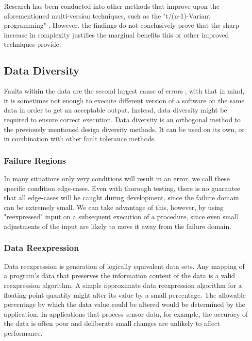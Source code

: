 \documentclass[12pt, letterpaper]{article}
\begin{document}
Research has been conducted into other methods that improve upon the aforementioned multi-version techniques, such as the "t/(n-1)-Variant programming" \cite{589928}. However, the findings do not conclusively prove that the sharp increase in complexity justifies the marginal benefits this or other improved techniques provide.

\subsection{Data Diversity}

Faults within the data are the second largest cause of errors \cite{nasa:stats}, with that in mind, it is sometimes not enough to execute different version of a software on the same data in order to get an acceptable output. Instead, data diversity might be required to ensure correct execution. Data diversity is an orthogonal method to the previously mentioned design diversity methods. It can be used on its own, or in combination with other fault tolerance methods.

\subsubsection{Failure Regions}

In many situations only very conditions will result in an error, we call these specific condition edge-cases. Even with thorough testing, there is no guarantee that all edge-cases will be caught during development, since the failure domain can be extremely small. We can take advantage of this, however, by using "reexpressed" input on a subsequent execution of a procedure, since even small adjustments of the input are likely to move it away from the failure domain. 

\subsubsection{Data Reexpression}

Data reexpression is generation of logically equivalent data sets. Any mapping of a program's data that preserves the information content of the data is a valid reexpression algorithm. A simple approximate data reexpression algorithm for a floating-point quantity might alter its value by a small percentage. The allowable percentage by which the data value could be altered would be determined by the application. In applications that process sensor data, for example, the accuracy of the data is often poor and deliberate small changes are unlikely to affect performance. \cite{nasa:datadiversity}
\end{document}
